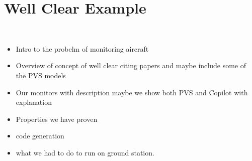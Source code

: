 \section{Well Clear Example}~\label{sec:WellClear}


\begin{itemize}
\item Intro to the probelm of monitoring aircraft
\item Overview of concept of well clear citing papers and maybe include some of the PVS models
\item Our monitors with description maybe we show both PVS and Copilot with explanation
\item Properties we have proven
\item code generation 
\item what we had to do to run on ground station. 
\end{itemize}

